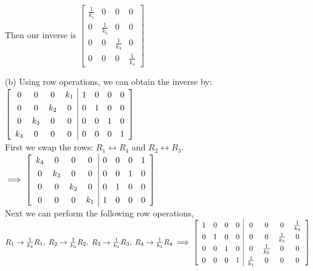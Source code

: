 \documentclass[addpoints]{exam}
\begin{document}
\begin{questions}
\begin{solution}
    Then our inverse is $ \begin{bmatrix}
        \frac{1}{k_1} & 0 & 0 & 0 \\ 0 & \frac{1}{k_2} & 0 & 0 \\ 0 & 0 & \frac{1}{k_3} & 0 \\ 0 & 0 & 0 & \frac{1}{k_4}
    \end{bmatrix} $

    \vspace{5mm}
    (b) Using row operations, we can obtain the inverse by: \\
    $ \renewcommand\arraystretch{1.3}
    \mleft[
    \begin{array}{cccc|cccc}
        0 & 0 & 0 & k_1 & 1 & 0 & 0 & 0 \\ 
        0 & 0 & k_2 & 0 & 0 & 1 & 0 & 0 \\ 
        0 & k_3 & 0 & 0 & 0 & 0 & 1 & 0 \\ 
        k_4 & 0 & 0 & 0 & 0 & 0 & 0 & 1
    \end{array}
    \mright]  
    $ \\ 
    First we swap the rows: $ R_1 \longleftrightarrow R_4 $ and $ R_2 \longleftrightarrow R_3 $. \\  
    $ \implies 
    \renewcommand\arraystretch{1.3}
    \mleft[
    \begin{array}{cccc|cccc}
        k_4 & 0 & 0 & 0 & 0 & 0 & 0 & 1 \\ 
        0 & k_3 & 0 & 0 & 0 & 0 & 1 & 0 \\ 
        0 & 0 & k_2 & 0 & 0 & 1 & 0 & 0 \\ 
        0 & 0 & 0 & k_1 & 1 & 0 & 0 & 0
    \end{array}
    \mright] 
    $ \\ 
    Next we can perform the following row operations, $ R_1 \rightarrow \frac{1}{k_4}R_1, \; R_2 \rightarrow \frac{1}{k_3}R_2, \; R_3 \rightarrow \frac{1}{k_2}R_3, \; R_4 \rightarrow \frac{1}{k_1}R_4 \\ 
    \implies 
    \renewcommand\arraystretch{1.3}
    \mleft[
    \begin{array}{cccc|cccc}
        1 & 0 & 0 & 0 & 0 & 0 & 0 & \frac{1}{k_4} \\ 
        0 & 1 & 0 & 0 & 0 & 0 & \frac{1}{k_3} & 0 \\ 
        0 & 0 & 1 & 0 & 0 & \frac{1}{k_2} & 0 & 0 \\ 
        0 & 0 & 0 & 1 & \frac{1}{k_1} & 0 & 0 & 0
    \end{array}
    \mright]
    $


\end{solution}
\end{questions}
\end{document}

